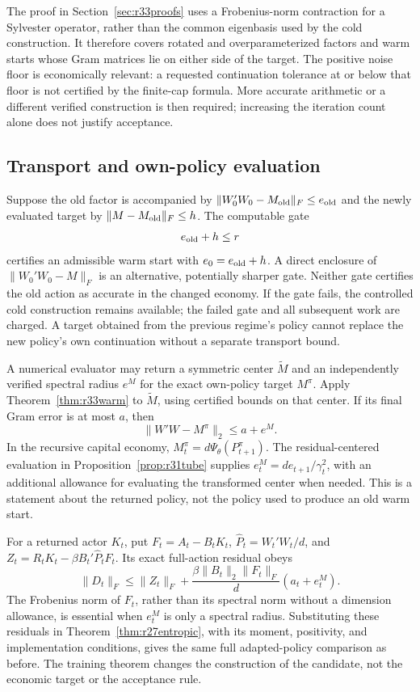 The proof in Section~\ref{sec:r33proofs} uses a Frobenius-norm contraction
for a Sylvester operator, rather than the common eigenbasis used by the cold
construction. It therefore covers rotated and overparameterized factors and
warm starts whose Gram matrices lie on either side of the target. The positive
noise floor is economically relevant: a requested continuation tolerance at
or below that floor is not certified by the finite-cap formula. More accurate
arithmetic or a different verified construction is then required; increasing
the iteration count alone does not justify acceptance.

\subsection{Transport and own-policy evaluation}
Suppose the old factor is accompanied by
$\|W_0'W_0-M_{\rm old}\|_F\leq e_{\rm old}$ and the newly evaluated target
by $\|M-M_{\rm old}\|_F\leq h$. The computable gate
\begin{equation}\label{eq:r33gate}
 e_{\rm old}+h\leq r
\end{equation}
certifies an admissible warm start with $e_0=e_{\rm old}+h$. A direct enclosure
of $\|W_0'W_0-M\|_F$ is an alternative, potentially sharper gate. Neither gate
certifies the old action as accurate in the changed economy. If the gate
fails, the controlled cold construction remains available; the failed gate
and all subsequent work are charged. A target obtained from the previous
regime's policy cannot replace the new policy's own continuation without a
separate transport bound.

A numerical evaluator may return a symmetric center $\widetilde M$ and an
independently verified spectral radius $e^M$ for the exact own-policy target
$M^\pi$. Apply Theorem~\ref{thm:r33warm} to $\widetilde M$, using certified
bounds on that center. If its final Gram error is at most $a$, then
\begin{equation}\label{eq:r33eval}
 \|W'W-M^\pi\|_2\leq a+e^M.
\end{equation}
In the recursive capital economy, $M_t^\pi=d\Psi_\theta(P_{t+1}^\pi)$.
The residual-centered evaluation in Proposition~\ref{prop:r31tube} supplies
$e_t^M=d e_{t+1}/\gamma_t^2$, with an additional allowance for evaluating the
transformed center when needed. This is a statement about the returned
policy, not the policy used to produce an old warm start.

For a returned actor $K_t$, put $F_t=A_t-B_tK_t$,
$\widehat P_t=W_t'W_t/d$, and
$Z_t=R_tK_t-\beta B_t'\widehat P_tF_t$. Its exact full-action residual obeys
\begin{equation}\label{eq:r33policy}
 \|D_t\|_F\leq\|Z_t\|_F+
 \frac{\beta\|B_t\|_2\|F_t\|_F}{d}(a_t+e_t^M).
\end{equation}
The Frobenius norm of $F_t$, rather than its spectral norm without a dimension
allowance, is essential when $e_t^M$ is only a spectral radius.
Substituting these residuals in Theorem~\ref{thm:r27entropic}, with its moment,
positivity, and implementation conditions, gives the same full adapted-policy
comparison as before. The training theorem changes the construction of the
candidate, not the economic target or the acceptance rule.

